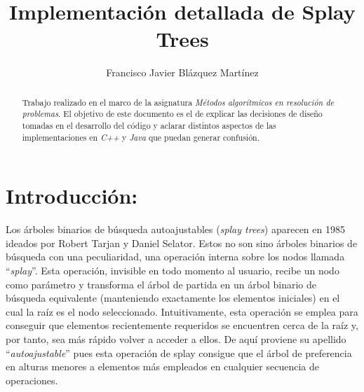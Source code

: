 \documentclass[letterpaper,12pt]{article}
\begin{document}
\title{\bf{Implementación detallada de Splay Trees}}
\author{Francisco Javier Blázquez Martínez}
\date{}
\maketitle

\begin{abstract}

Trabajo realizado en el marco de la asignatura \textit{Métodos algorítmicos 
en resolución de problemas}. El objetivo de este documento es el de explicar
las decisiones de diseño tomadas en el desarrollo del código y aclarar 
distintos aspectos de las implementaciones en \textit{C++} y \textit{Java} 
que puedan generar confusión.

\end{abstract}

\section{Introducción:}

Los árboles binarios de búsqueda autoajustables (\textit{splay trees}) 
aparecen en 1985 ideados por Robert Tarjan y Daniel Selator.
Estos no son sino árboles binarios de búsqueda con una peculiaridad, una 
operación interna sobre los nodos llamada ``\textit{splay}''. Esta operación, 
invisible en todo momento al usuario, recibe un nodo como parámetro y 
transforma el árbol de partida en un árbol binario de búsqueda equivalente 
(manteniendo exactamente los elementos iniciales) en el cual la raíz es el 
nodo seleccionado. Intuitivamente, esta operación se emplea para conseguir 
que elementos recientemente requeridos se encuentren cerca de la raíz y, por 
tanto, sea más rápido volver a acceder a ellos. De aquí proviene su apellido 
``\textit{autoajustable}'' pues esta operación de splay consigue que el árbol 
de preferencia en alturas menores a elementos más empleados en cualquier 
secuencia de operaciones.
\end{document}
